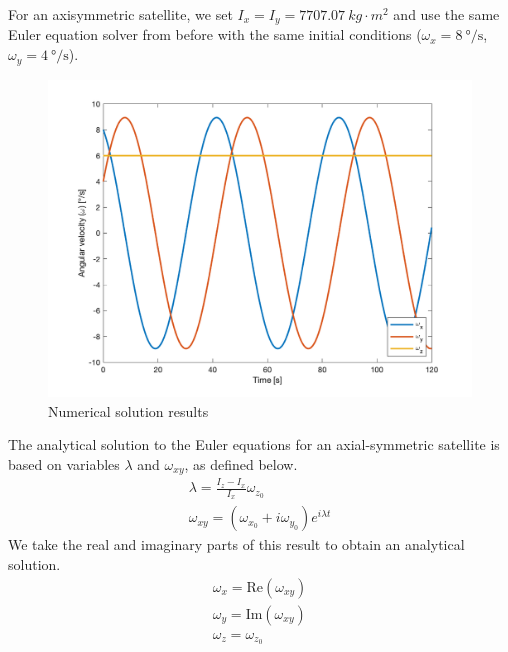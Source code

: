For an axisymmetric satellite, we set $I_{x} = I_{y} = \qty{7707.07}{kg \cdot m^2}$ and use the same Euler equation solver from before with the same initial conditions ($\omega_{x} = \qty{8}{\degree\per\second}$, $\omega_{y} = \qty{4}{\degree\per\second}$).

\begin{figure}[H]
\centering
\includegraphics[scale=0.6]{Images/ps3_problem1.png}
\caption{Numerical solution results}
\label{fig:ps3_problem1}
\end{figure}

The analytical solution to the Euler equations for an axial-symmetric satellite is based on variables $\lambda$ and $\omega_{xy}$, as defined below.
\begin{align*}
    \lambda = \frac{I_{z} - I_{x}}{I_{x}} \omega_{z_{0}} \\
    \omega_{xy} = (\omega_{x_{0}} + i \omega_{y_{0}}) e^{i \lambda t}
\end{align*}
We take the real and imaginary parts of this result to obtain an analytical solution.
\begin{align*}
    \omega_x = \text{Re}(\omega_{xy}) \\
    \omega_y = \text{Im}(\omega_{xy}) \\ 
    \omega_z = \omega_{z_{0}}
\end{align*}

